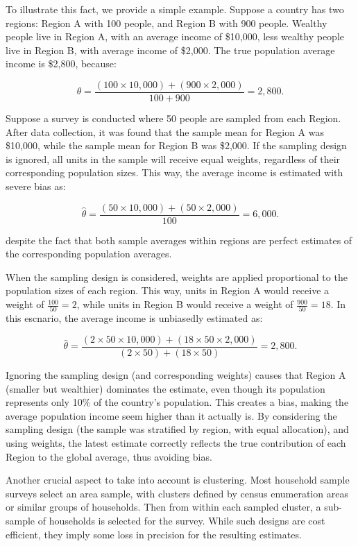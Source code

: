\documentclass[
  12pt,
]{book}
\begin{document}
To illustrate this fact, we provide a simple example. Suppose a country has two regions: Region A with 100 people, and Region B with 900 people. Wealthy people live in Region A, with an average income of \$10,000, less wealthy people live in Region B, with average income of \$2,000. The true population average income is \$2,800, because:

\[
\theta = \frac{(100 \times 10,000) + (900 \times 2,000)}{100 + 900} = 2,800.
\]

Suppose a survey is conducted where 50 people are sampled from each Region. After data collection, it was found that the sample mean for Region A was \$10,000, while the sample mean for Region B was \$2,000. If the sampling design is ignored, all units in the sample will receive equal weights, regardless of their corresponding population sizes. This way, the average income is estimated with severe bias as:

\[
\hat \theta = \frac{(50 \times 10,000) + (50 \times 2,000)}{100} = 6,000.
\]

despite the fact that both sample averages within regions are perfect estimates of the corresponding population averages.

When the sampling design is considered, weights are applied proportional to the population sizes of each region. This way, units in Region A would receive a weight of \(\frac{100}{50} = 2\), while units in Region B would receive a weight of \(\frac{900}{50} = 18\). In this escnario, the average income is unbiasedly estimated as:

\[
\hat \theta = \frac{(2 \times 50 \times 10,000) + (18 \times 50 \times 2,000)}{(2 \times 50) + (18 \times 50)} = 2,800.
\]

Ignoring the sampling design (and corresponding weights) causes that Region A (smaller but wealthier) dominates the estimate, even though its population represents only 10\% of the country's population. This creates a bias, making the average population income seem higher than it actually is. By considering the sampling design (the sample was stratified by region, with equal allocation), and using weights, the latest estimate correctly reflects the true contribution of each Region to the global average, thus avoiding bias.

Another crucial aspect to take into account is clustering. Most household sample surveys select an area sample, with clusters defined by census enumeration areas or similar groups of households. Then from within each sampled cluster, a sub-sample of households is selected for the survey. While such designs are cost efficient, they imply some loss in precision for the resulting estimates.
\end{document}
